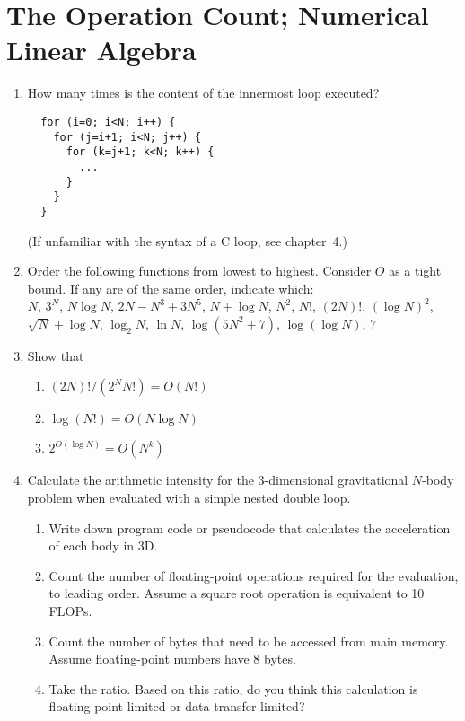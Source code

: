 \documentclass{article}
\begin{document}
\section{The Operation Count; Numerical Linear Algebra}
\begin{enumerate}

\item
How many times is the content of the innermost loop executed?
\begin{verbatim}
  for (i=0; i<N; i++) {
    for (j=i+1; i<N; j++) {
      for (k=j+1; k<N; k++) {
        ...
      }
    }
  }
\end{verbatim}
(If unfamiliar with the syntax of a C loop, see chapter~4.)


\item 
Order the following functions from lowest to highest. Consider $O$ as a tight bound. If any are of the same order, indicate which:\\
$N$,  $3^N$, $N\log N$, 
$2N-N^3 +3N^5$, $N +\log N$, $N^2$,  $N!$, $(2N)!$, 
$(\log N)^2$, $\sqrt{N} + \log N$, $\log_2 N$, $\ln N$, 
$\log (5N^2+7)$, $\log(\log N)$, $7$


\item Show that
  \begin{enumerate} \setlength{\itemsep}{0pt}
  \item $(2N)! / (2^N N!)  = O(N!)$
  \item $\log(N!) = O(N \log N)$
  \item $2^{O(\log N)} = O(N^k)$
\end{enumerate}

  
\item {}
Calculate the arithmetic intensity for the 3-dimensional gravitational $N$-body problem when evaluated with a simple nested double loop.
\vspace{-1em}
\begin{enumerate} \setlength{\itemsep}{0pt}
\item Write down program code or pseudocode that calculates the acceleration of each body
in 3D.
\item Count the number of floating-point operations required for
the evaluation, to leading order. Assume a square root operation is equivalent to 10 FLOPs. 
\item Count the number of bytes that need to be
accessed from main memory. Assume floating-point numbers have 8 bytes. 
\item Take the ratio.
Based on this ratio, do you think this calculation is floating-point
limited or data-transfer limited?
\end{enumerate}

\end{enumerate}
\end{document}
